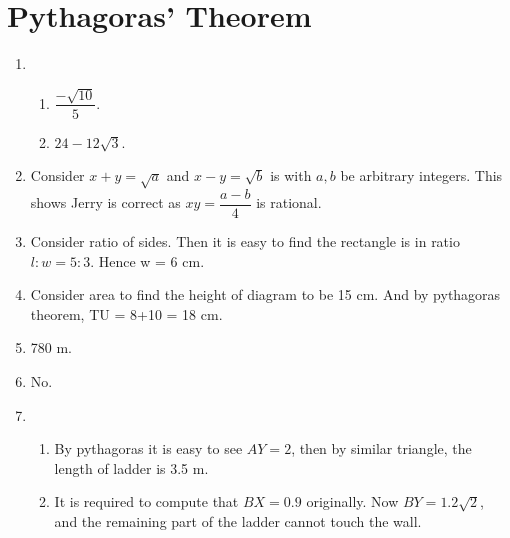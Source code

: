 \documentclass[12pt]{article}
\begin{document}
    \section{Pythagoras' Theorem}
    \begin{enumerate}
        \item \begin{enumerate}
            \item $\dfrac{-\sqrt{10}}{5}$.
            \item $24-12\sqrt{3}$.
        \end{enumerate}
        \item Consider $x+y=\sqrt{a}$ and $x-y=\sqrt{b}$ is with $a,b$ be arbitrary integers. This shows Jerry is correct as $xy=\dfrac{a-b}{4}$ is rational.
        \item Consider ratio of sides. Then it is easy to find the rectangle is in ratio $l:w=5:3$. Hence w = 6 cm.
        \item Consider area to find the height of diagram to be 15 cm. And by pythagoras theorem, TU = 8+10 = 18 cm.
        \item 780 m.
        \item No.
        \item \begin{enumerate}
            \item By pythagoras it is easy to see $AY=2$, then by similar triangle, the length of ladder is 3.5 m.
            \item It is required to compute that $BX = 0.9$ originally. Now $BY = 1.2\sqrt{2}$, and the remaining part of the ladder cannot touch the wall.
        \end{enumerate}
    \end{enumerate}

    \newpage
\end{document}
